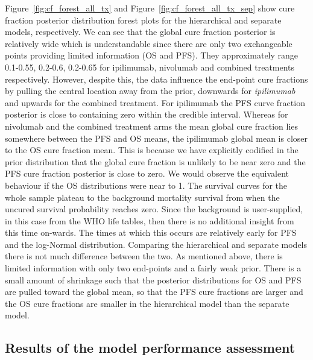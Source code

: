 \documentclass[AMA,STIX1COL]{WileyNJD-v2}
\begin{document}
Figure~\ref{fig:cf_forest_all_tx} and Figure~\ref{fig:cf_forest_all_tx_sep} show cure fraction posterior distribution forest plots for the hierarchical and separate models, respectively. 
We can see that the global cure fraction posterior is relatively wide which is understandable since there are only two exchangeable points providing limited information (OS and PFS).
They approximately range 0.1-0.55, 0.2-0.6, 0.2-0.65 for ipilimumab, nivolumab and combined treatments respectively. 
However, despite this, the data influence the end-point cure fractions by pulling the central location away from the prior, downwards for {\it ipilimumab} and upwards for the combined treatment.
For ipilimumab the PFS curve fraction posterior is close to containing zero within the credible interval.
Whereas for nivolumab and the combined treatment arms the mean global cure fraction lies somewhere between the PFS and OS means, the ipilimumab global mean is closer to the OS cure fraction mean. This is because we have explicitly codified in the prior distribution that the global cure fraction is unlikely to be near zero and the PFS cure fraction posterior is close to zero.
We would observe the equivalent behaviour if the OS distributions were near to 1.
The survival curves for the whole sample plateau to the background mortality survival from when the uncured survival probability reaches zero.
Since the background is user-supplied, in this case from the WHO life tables, then there is no additional insight from this time on-wards.
The times at which this occurs are relatively early for PFS and the log-Normal distribution.
Comparing the hierarchical and separate models there is not much difference between the two.
As mentioned above, there is limited information with only two end-points and a fairly weak prior.
There is a small amount of shrinkage such that the posterior distributions for OS and PFS are pulled toward the global mean, so that the PFS cure fractions are larger and the OS cure fractions are smaller in the hierarchical model than the separate model.

%
\subsection{Results of the model performance assessment}
\end{document}
